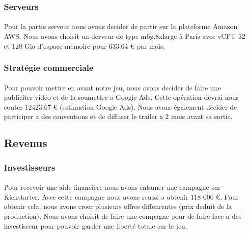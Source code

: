 \documentclass{article}
\begin{document}
\subsubsection{Serveurs}
\paragraph{} Pour la partie serveur nous avons decider de partir sur la plateforme Amazon AWS. Nous avons choisit un derveur de type m6g.8xlarge à Paris avec vCPU 32 et 128 Gio d'espace memoire pour 633.64 € par mois.

\subsubsection{Stratégie commerciale}
\paragraph{} Pour pouvoir mettre en avant notre jeu, nous avons decider de faire une publiciter vidéo et de la soumettre a Google Ads. Cette opération devrai nous couter 12423.67 € (estimation Google Ads). Nous avons également décider de participer a des conventions et de diffuser le trailer a 2 mois avant sa sortie.

\subsection{Revenus}
\subsubsection{Investisseurs}
\paragraph{} Pour recevoir une aide financière nous avons entamer une campagne sur Kickstarter. Avec cette campagne nous avons reussi a obtenir 118 000 €. Pour obtenir cela, nous avons creer plusieurs offres diffenrentes (prix deduit de la production). Nous avons choisit de faire une compagne pour de faire face a des investisseur pour pouvoir garder une liberté totale sur le jeu.\\
\end{document}
